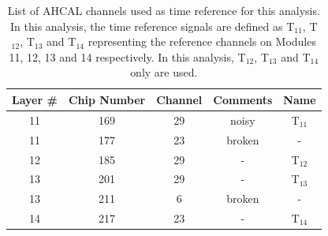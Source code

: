 \documentclass{JINST}
\begin{document}
\begin{table}[htb!]
  \centering
  \caption{List of the different SiPMs used in the CALICE AHCAL in July 2015.}
  \label{table:sipm_list}
\end{table}

\begin{table}[htb!]
  \centering
  \caption{List of AHCAL channels used as time reference for this analysis. In this analysis, the time reference signals are defined as T$_{11}$, T$_{12}$, T$_{13}$ and T$_{14}$ representing the reference channels on Modules 11, 12, 13 and 14 respectively. In this analysis, T$_{12}$, T$_{13}$ and T$_{14}$ only are used.}
  \label{table:trigger_ref}
  \begin{tabular}{@{} ccccc @{}}
    \toprule
    Layer \# & Chip Number & Channel & Comments & Name \\
    \midrule
    11 & 169 & 29 & noisy & T$_{11}$ \\
    11 & 177 & 23 & broken & - \\
    12 & 185 & 29 & - & T$_{12}$ \\
    13 & 201 & 29 & -  & T$_{13}$ \\
    13 & 211 & 6 & broken & - \\
    14 & 217 & 23 & - & T$_{14}$ \\
    \bottomrule
  \end{tabular}
\end{table}
\end{document}
